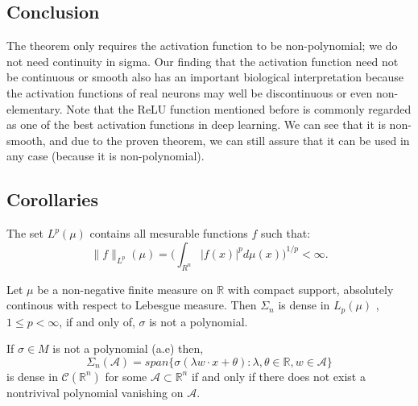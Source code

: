\documentclass[../main.tex]{subfiles}
\begin{document}
\subsection{Conclusion}


	\noindent The theorem only requires the activation function to be non-polynomial; we do not need continuity in sigma. Our finding that the activation function need not be continuous or smooth also has an important biological interpretation because the activation functions of real neurons may well be discontinuous or even non-elementary. Note that the ReLU function mentioned before is commonly regarded as one of the best activation functions in deep learning. We can see that it is non-smooth, and due to the proven theorem, we can still assure that it can be used in any case (because it is non-polynomial).
\subsection{Corollaries}


\begin{definition} The set $L^{p}(\mu)$ contains all mesurable functions $f$ such that: 
	$$ \|f\|_{L^p}(\mu) = \Big( \int_{R^n} |f(x)|^p d\mu(x)\Big)^{1/p} < \infty. $$
	
\end{definition}

\begin{propo}
	Let $\mu $ be a non-negative finite measure on $\mathbb{R}$ with compact support, absolutely continous with respect to Lebesgue measure. Then $\Sigma_n$ is dense in $L_p(\mu)$ , $1\leq p < \infty$, if and only of, $\sigma$ is not a polynomial.
\end{propo}

\begin{propo}
	If $\sigma\in M$ is not a polynomial (a.e) then, $$ \Sigma_n(\mathcal{A})= span \{ \sigma(\lambda w \cdot x + \theta) : \lambda, \theta \in \mathbb{R}, w \in \mathcal{A} \}$$
	is dense in $\mathcal{C}(\mathbb{R}^n)$ for some $\mathcal{A}\subset \mathbb{R}^n$ if and only if there does not exist a nontrivival polynomial vanishing on $\mathcal{A}$.
\end{propo}
 
\end{document}
